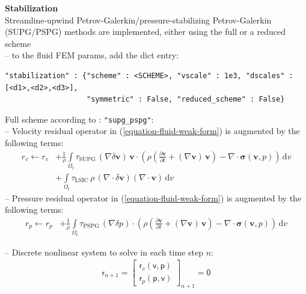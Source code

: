 \documentclass[a4paper,12pt]{report}
\newcommand{\bs}[1]{\boldsymbol{#1}}
\newcommand{\Om}{\mathit{\Omega}}
\newcommand{\ROP}{\bs{\mathsf{r}}}
\begin{document}
\textbf{Stabilization}\\

Streamline-upwind Petrov-Galerkin/pressure-stabilizing Petrov-Galerkin (SUPG/PSPG) methods are implemented, either using the full or a reduced scheme\\

-- to the fluid FEM params, add the dict entry:

\begin{Verbatim}[breaklines=true]
"stabilization" : {"scheme" : <SCHEME>, "vscale" : 1e3, "dscales" : [<d1>,<d2>,<d3>],
                   "symmetric" : False, "reduced_scheme" : False}
\end{Verbatim}

Full scheme according to \cite{tezduyar2000}: \verb."supg_pspg".:\\
-- Velocity residual operator in (\ref{equation-fluid-weak-form}) is augmented by the following terms:
\begin{equation}
\begin{aligned}
r_v \leftarrow r_v &+ \frac{1}{\rho}\int\limits_{\Om_t} \tau_{\mathrm{SUPG}}\,(\nabla\delta\boldsymbol{v})\,\boldsymbol{v} \cdot \left(\rho\left(\frac{\partial \boldsymbol{v}}{\partial t} + (\nabla\boldsymbol{v})\,\boldsymbol{v}\right) - \nabla \cdot \boldsymbol{\sigma}(\boldsymbol{v},p)\right)\,\mathrm{d}v \\
& + \int\limits_{\Om_t} \tau_{\mathrm{LSIC}}\,\rho\,(\nabla\cdot\delta\boldsymbol{v})(\nabla\cdot\boldsymbol{v})\,\mathrm{d}v
\end{aligned}
\end{equation}
-- Pressure residual operator in (\ref{equation-fluid-weak-form}) is augmented by the following terms:
\begin{equation}
\begin{aligned}
r_p \leftarrow r_p &+ \frac{1}{\rho}\int\limits_{\Om_t} \tau_{\mathrm{PSPG}}\,(\nabla\delta p) \cdot \left(\rho\left(\frac{\partial \boldsymbol{v}}{\partial t} + (\nabla\boldsymbol{v})\,\boldsymbol{v}\right) - \nabla \cdot \boldsymbol{\sigma}(\boldsymbol{v},p)\right)\,\mathrm{d}v 
\end{aligned}
\end{equation}

-- Discrete nonlinear system to solve in each time step $n$:
\begin{equation}
\label{equation-nonlin-sys-fluid}
\begin{aligned}
\ROP_{n+1} = \begin{bmatrix} \ROP_{v}(\boldsymbol{\mathsf{v}},\boldsymbol{\mathsf{p}}) \\ \ROP_{p}(\boldsymbol{\mathsf{p}},\boldsymbol{\mathsf{v}}) \end{bmatrix}_{n+1} = \boldsymbol{\mathsf{0}}
\end{aligned}
\end{equation}
\end{document}
